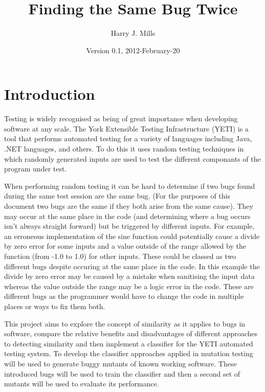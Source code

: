 \documentclass[authoryearcitations]{UoYCSproject}
\author{Harry J. Mills}
\title{Finding the Same Bug Twice}
\date{Version 0.1, 2012-February-20}
\begin{document}
\maketitle


\chapter{Introduction}
\label{cha:Introduction}

Testing is widely recognised as being of great importance when developing software at any scale. The York Extensible Testing Infrastructure (YETI) is a tool that performs automated testing for a variety of languages including Java, .NET languages, and others. To do this it uses random testing techniques in which randomly generated inputs are used to test the different componants of the program under test.

When performing random testing it can be hard to determine if two bugs found during the same test session are the same bug. (For the purposes of this document two bugs are the same if they both arise from the same cause). They may occur at the same place in the code (and determining where a bug occurs isn't always straight forward) but be triggered by different inputs. For example, an erroneous implementation of the sine function could potentially cause a divide by zero error for some inputs and a value outside of the range allowed by the function (from -1.0 to 1.0) for other inputs. These could be classed as two different bugs despite occuring at the same place in the code. In this example the divide by zero error may be caused by a mistake when sanitising the input data whereas the value outside the range may be a logic error in the code. These are different bugs as the programmer would have to change the code in multiple places or ways to fix them both.

This project aims to explore the concept of similarity as it applies to bugs in software, compare the relative benefits and disadvantages of different approaches to detecting similarity and then implement a classifier for the YETI automated testing system. To develop the classifier approaches applied in mutation testing will be used to generate buggy mutants of known working software. These introduced bugs will be used to train the classifier and then a second set of mutants will be used to evaluate its performance.
\end{document}
